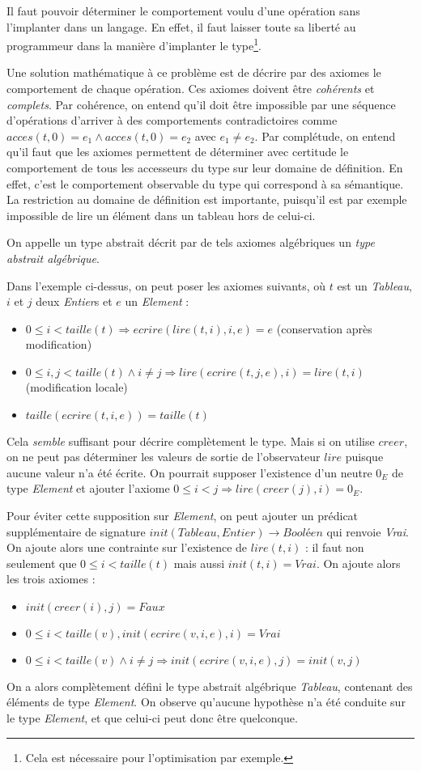 \documentclass[../../../main.tex]{subfiles}
\begin{document}
Il faut pouvoir déterminer le comportement voulu d'une opération sans l'implanter dans un langage. En effet, il faut laisser toute sa liberté au programmeur dans la manière d'implanter le type\footnote{Cela est nécessaire pour l'optimisation par exemple.}. 

Une solution mathématique à ce problème est de décrire par des axiomes le comportement de chaque opération. Ces axiomes doivent être \textit{cohérents} et \textit{complets}. Par cohérence, on entend qu'il doit être impossible par une séquence d'opérations d'arriver à des comportements contradictoires comme $acces(t, 0) = e_1 \wedge acces(t, 0) = e_2$ avec $e_1 \neq e_2$. Par complétude, on entend qu'il faut que les axiomes permettent de déterminer avec certitude le comportement de tous les accesseurs du type sur leur domaine de définition. En effet, c'est le comportement observable du type qui correspond à sa sémantique. La restriction au domaine de définition est importante, puisqu'il est par exemple impossible de lire un élément dans un tableau hors de celui-ci.

On appelle un type abstrait décrit par de tels axiomes algébriques un \textit{type abstrait algébrique}.

Dans l'exemple ci-dessus, on peut poser les axiomes suivants, où $t$ est un \textit{Tableau}, $i$ et $j$ deux \textit{Entier}s et $e$ un \textit{Element} : 
\begin{itemize}
	\item $0\leq i < taille(t) \Rightarrow ecrire(lire(t, i), i, e) = e$ (conservation après modification)
	\item $0\leq i, j < taille(t) \wedge i \neq j \Rightarrow lire(ecrire(t, j, e), i) = lire(t, i)$ (modification locale)
	\item $taille(ecrire(t, i, e)) = taille(t)$
\end{itemize}
Cela \textit{semble} suffisant pour décrire complètement le type. Mais si on utilise $creer$, on ne peut pas déterminer les valeurs de sortie de l'observateur $lire$ puisque aucune valeur n'a été écrite. On pourrait supposer l'existence d'un neutre $0_E$ de type \textit{Element} et ajouter l'axiome $0\leq i < j \Rightarrow lire(creer(j), i) = 0_E$.

Pour éviter cette supposition sur \textit{Element}, on peut ajouter un prédicat supplémentaire de signature $init(Tableau, Entier) \rightarrow \textit{Booléen}$ qui renvoie \textit{Vrai}. On ajoute alors une contrainte sur l'existence de $lire(t, i)$ : il faut non seulement que $0\leq i < taille(t)$ mais aussi $init(t, i) = Vrai$. On ajoute alors les trois axiomes :
\begin{itemize}
	\item $init(creer(i), j) = Faux$
	\item $0\leq i < taille(v), init(ecrire(v, i, e), i) = Vrai$
	\item $0\leq i < taille(v) \wedge i\neq j \Rightarrow init(ecrire(v, i, e), j) = init(v, j)$
\end{itemize}
On a alors complètement défini le type abstrait algébrique \textit{Tableau}, contenant des éléments de type \textit{Element}. On observe qu'aucune hypothèse n'a été conduite sur le type \textit{Element}, et que celui-ci peut donc être quelconque.
\end{document}

